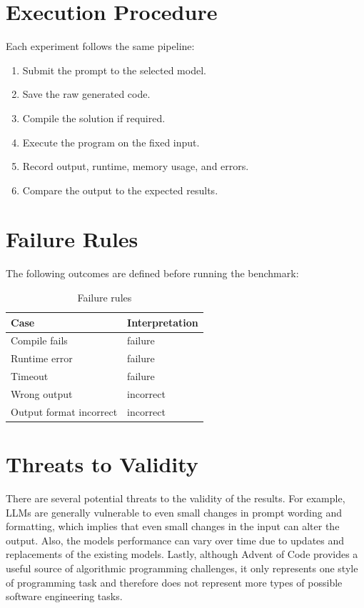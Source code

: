 \documentclass[12pt,a4paper]{report}
\begin{document}
\section{Execution Procedure}
Each experiment follows the same pipeline:
\begin{enumerate}
    \item Submit the prompt to the selected model.
    \item Save the raw generated code.
    \item Compile the solution if required.
    \item Execute the program on the fixed input.
    \item Record output, runtime, memory usage, and errors.
    \item Compare the output to the expected results.
\end{enumerate}

\section{Failure Rules}
The following outcomes are defined before running the benchmark:

\begin{table}[H]
\centering
\caption{Failure rules}
\begin{tabular}{ll}
\toprule
Case & Interpretation \\
\midrule
Compile fails & failure \\
Runtime error & failure \\
Timeout & failure \\
Wrong output & incorrect \\
Output format incorrect & incorrect \\
\bottomrule
\end{tabular}
\end{table}

\section{Threats to Validity}
There are several potential threats to the validity of the results. For example, LLMs are generally vulnerable to even small changes in prompt wording and formatting, which implies that even small changes in the input can alter the output. Also, the models performance can vary over time due to updates and replacements of the existing models. Lastly, although Advent of Code provides a useful source of algorithmic programming challenges, it only represents one style of programming task and therefore does not represent more types of possible software engineering tasks.
\end{document}
